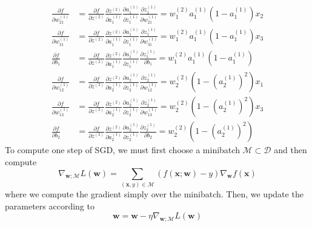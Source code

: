 \documentclass{article}
\begin{document}
\begin{solution}
\begin{align}
        \frac{\partial f}{\partial w_{21}^{(1)}} & = \frac{\partial f}{\partial z^{(2)}} \frac{\partial z^{(2)}}{\partial a^{(1)}_1} \frac{\partial a^{(1)}_1}{\partial z_1^{(1)}} \frac{\partial z_1^{(1)}}{\partial w_{21}^{(1)}} = w_1^{(2)} a_1^{(1)} (1 - a_1^{(1)}) x_2\\
        \frac{\partial f}{\partial w_{31}^{(1)}} & = \frac{\partial f}{\partial z^{(2)}} \frac{\partial z^{(2)}}{\partial a^{(1)}_1} \frac{\partial a^{(1)}_1}{\partial z_1^{(1)}} \frac{\partial z_1^{(1)}}{\partial w_{31}^{(1)}} = w_1^{(2)} a_1^{(1)} (1 - a_1^{(1)}) x_3\\
        \frac{\partial f}{\partial b_{1}} & = \frac{\partial f}{\partial z^{(2)}} \frac{\partial z^{(2)}}{\partial a^{(1)}_1} \frac{\partial a^{(1)}_1}{\partial z_1^{(1)}} \frac{\partial z_1^{(1)}}{\partial b_{1}}  = w_1^{(2)} a_1^{(1)} (1 - a_1^{(1)}) \\
        \frac{\partial f}{\partial w_{12}^{(1)}} & = \frac{\partial f}{\partial z^{(2)}} \frac{\partial z^{(2)}}{\partial a^{(1)}_2} \frac{\partial a^{(1)}_2}{\partial z_2^{(1)}} \frac{\partial z_2^{(1)}}{\partial w_{12}^{(1)}} = w_2^{(2)} (1 - (a_2^{(1)})^2 ) x_1\\
        \frac{\partial f}{\partial w_{13}^{(1)}} & = \frac{\partial f}{\partial z^{(2)}} \frac{\partial z^{(2)}}{\partial a^{(1)}_2} \frac{\partial a^{(1)}_2}{\partial z_2^{(1)}} \frac{\partial z_2^{(1)}}{\partial w_{13}^{(1)}} = w_2^{(2)} (1 - (a_2^{(1)})^2 ) x_3 \\
        \frac{\partial f}{\partial b_{2}} & = \frac{\partial f}{\partial z^{(2)}} \frac{\partial z^{(2)}}{\partial a^{(1)}_2} \frac{\partial a^{(1)}_2}{\partial z_2^{(1)}} \frac{\partial z_2^{(1)}}{\partial b_{2}} = w_2^{(2)} (1 - (a_2^{(1)})^2 )
    \end{align}
    To compute one step of SGD, we must first choose a minibatch $\mathcal{M} \subset \mathcal{D}$ and then compute 
    \begin{equation}
      \nabla_{\mathbf{w}; \mathcal{M}} L(\mathbf{w}) = \sum_{(\mathbf{x}, y) \in \mathcal{M}} (f(\mathbf{x}; \mathbf{w}) - y) \nabla_{\mathbf{w}} f(\mathbf{x})
    \end{equation}
    where we compute the gradient simply over the minibatch. Then, we update the parameters according to 
    \begin{equation}
      \mathbf{w} = \mathbf{w} - \eta \nabla_{\mathbf{w}; \mathcal{M}} L(\mathbf{w})
    \end{equation}
  \end{solution}
\end{document}
